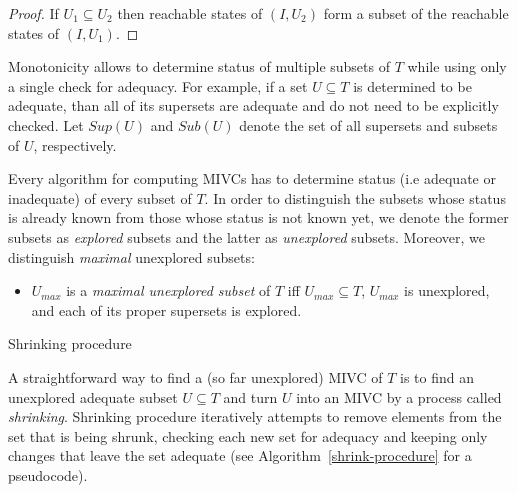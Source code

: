 \begin{proof}
If $U_1 \subseteq U_2$ then reachable states of $(I, U_2)$ form  a subset of the reachable states
of $(I, U_1)$.
\end{proof}
%


Monotonicity allows  to determine status  of multiple subsets of $T$ while using only a single check for adequacy. For example, if a set $U \subseteq T$ is determined to be adequate, than all of its supersets are   adequate and do not need to be explicitly checked. Let     $\mathit{Sup}(U)$ and $\mathit{Sub}(U)$ denote the set of all supersets and subsets of $U$, respectively.

Every algorithm for computing MIVCs has to determine status (i.e adequate or inadequate) of every subset of $T$.  In order to distinguish the subsets whose status is already known from those whose status is not known yet, we denote the former subsets as \emph{explored} subsets and the latter as \emph{unexplored} subsets. Moreover, we distinguish \emph{maximal} unexplored subsets:
\begin{itemize}
	\item $U_{max}$ is a \emph{maximal unexplored subset} of $T$ iff $U_{max} \subseteq T$, $U_{max}$ is unexplored, and each of its proper supersets is explored.
\end{itemize}



\begin{algorithm}[!t]\label{shrink-procedure}

\caption{Shrinking procedure }
\end{algorithm}


A straightforward way to find a (so far unexplored) MIVC of $T$ is to find an unexplored adequate subset $U \subseteq T$ and turn $U$  into an MIVC by a process called \emph{shrinking}. Shrinking procedure iteratively attempts to remove elements from the set that is being shrunk, checking each new set for adequacy and keeping only changes that
leave the set adequate (see Algorithm~\ref{shrink-procedure} for a pseudocode). 

